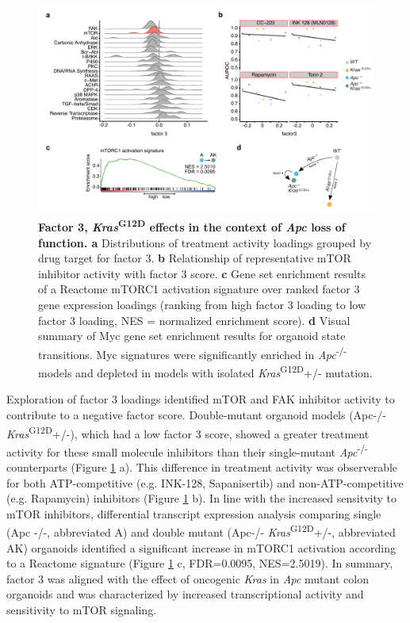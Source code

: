 \begin{flushleft}
\begin{figure}[h]
\centering
\includegraphics[scale=0.75,
                keepaspectratio]{figures/adenomaprofiling/pdf/fig_4_1.pdf}
\caption[Factor 3, \textit{Kras}\textsuperscript{G12D} effects in the context of \textit{Apc} loss of function]{\textbf{Factor 3, \textit{Kras}\textsuperscript{G12D} effects in the context of \textit{Apc} loss of function. a} Distributions of treatment activity loadings grouped by drug target for factor 3. \textbf{b} Relationship of representative mTOR inhibitor activity with factor 3 score. \textbf{c} Gene set enrichment results of a Reactome mTORC1 activation signature over ranked factor 3 gene expression loadings (ranking from high factor 3 loading to low factor 3 loading, NES = normalized enrichment score). \textbf{d} Visual summary of Myc gene set enrichment results for organoid state transitions. Myc signatures were significantly enriched in \textit{Apc}\textsuperscript{-/-}  models and depleted in models with isolated \textit{Kras}\textsuperscript{G12D}+/- mutation.}
\label{fig_300}
\end{figure}
\bigbreak

Exploration of factor 3 loadings identified mTOR and FAK inhibitor activity to contribute to a negative factor score. Double-mutant organoid models (Apc-/- \textit{Kras}\textsuperscript{G12D}+/-), which had a low factor 3 score, showed a greater treatment activity for these small molecule inhibitors than their single-mutant \textit{Apc}\textsuperscript{-/-}  counterparts (Figure \ref{fig_300} a). This difference in treatment activity was observerable for both ATP-competitive (e.g. INK-128, Sapanisertib) and non-ATP-competitive (e.g. Rapamycin) inhibitors (Figure \ref{fig_300} b). In line with the increased sensitvity to mTOR inhibitors, differential transcript expression analysis comparing single (Apc -/-, abbreviated A) and double mutant (Apc-/- \textit{Kras}\textsuperscript{G12D}+/-, abbreviated AK) organoids identified a significant increase in mTORC1 activation according to a Reactome signature (Figure \ref{fig_300} c, FDR=0.0095, NES=2.5019). In summary, factor 3 was aligned with the effect of oncogenic \textit{Kras} in \textit{Apc} mutant colon organoids and was characterized by increased transcriptional activity and sensitivity to mTOR signaling.



\end{flushleft}
